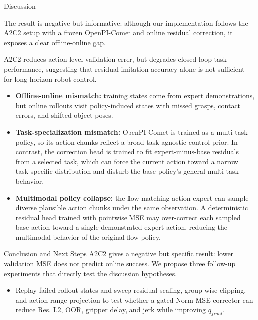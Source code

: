 \documentclass[final]{beamer}
\newlength{\colwidth}
\begin{document}
\begin{frame}[t]
\begin{columns}[t]
\begin{column}{\colwidth}
			\begin{block}{Discussion}
				
				The result is negative but informative: although our implementation follows
				the A2C2 setup with a frozen OpenPI-Comet and online residual correction,
				it exposes a clear offline-online gap. 
				
				\medskip

				A2C2 reduces action-level validation error, but degrades closed-loop task
				performance, suggesting that residual imitation accuracy alone is not
				sufficient for long-horizon robot control.
				
				\medskip
				\begin{itemize}
					\setlength{\itemsep}{0.6em}
					\item \textbf{Offline-online mismatch:} training states come from expert
					demonstrations, but online rollouts visit policy-induced states with missed
					grasps, contact errors, and shifted object poses.

					\item \textbf{Task-specialization mismatch:} OpenPI-Comet is trained as a
					multi-task policy, so its action chunks reflect a broad task-agnostic control
					prior. In contrast, the correction head is trained to fit expert-minus-base
					residuals from a selected task, which can force the current action toward a
					narrow task-specific distribution and disturb the base policy's general
					multi-task behavior.

					\item \textbf{Multimodal policy collapse:} the flow-matching action expert can
					sample diverse plausible action chunks under the same observation. A
					deterministic residual head trained with pointwise MSE may over-correct each
					sampled base action toward a single demonstrated expert action, reducing the
					multimodal behavior of the original flow policy.
				\end{itemize}
				
			\end{block}

			
			\begin{block}{Conclusion and Next Steps}
				A2C2 gives a negative but specific result: lower validation MSE does not
				predict online success. We propose three follow-up experiments that directly
				test the discussion hypotheses.
				
				\begin{itemize}
					\item Replay failed rollout states and
					sweep residual scaling, group-wise clipping, and action-range projection to
					test whether a gated Norm-MSE corrector can reduce Res. L2, OOR, gripper
					delay, and jerk while improving $q_{final}$.
			

\end{itemize}
\end{block}
\end{column}
\end{columns}
\end{frame}
\end{document}
